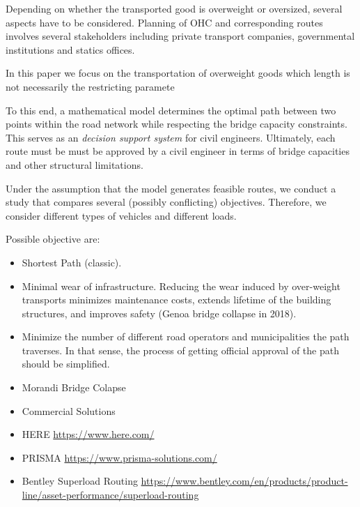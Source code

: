 Depending on whether the transported good is overweight or oversized, several aspects have to be considered.
Planning of OHC and corresponding routes involves several stakeholders including private transport companies, governmental institutions and statics offices.



In this paper we focus on the transportation of overweight goods which length is not necessarily the restricting paramete


To this end, a mathematical model determines the optimal path between two
points within the road network while respecting the bridge capacity constraints.
This serves as an \textit{decision support system} for civil engineers.
Ultimately,  each route must be must be approved by a civil engineer  in terms of
bridge capacities and other structural limitations.

Under the assumption that the model generates feasible routes,
we conduct a study that compares several (possibly conflicting) objectives.
Therefore, we consider different types of vehicles and different loads.

Possible objective are:
\begin{itemize}
  \item Shortest Path (classic).

  \item Minimal wear of infrastructure. Reducing the wear induced by over-weight transports
  minimizes maintenance costs, extends lifetime of the building structures, and
  improves safety (Genoa bridge collapse in 2018).

  \item Minimize the number of different road operators and municipalities the path
  traverses. In that sense, the process of getting official approval of the
  path should be simplified.
\end{itemize}

\begin{itemize}
\item Morandi Bridge Colapse

\cite{Morgese.2020}
\cite{MorandiNYTimes}


\item Commercial Solutions

\item HERE
\url{https://www.here.com/}
\item PRISMA
\url{https://www.prisma-solutions.com/}

\item Bentley Superload Routing
\url{https://www.bentley.com/en/products/product-line/asset-performance/superload-routing}

\end{itemize}
